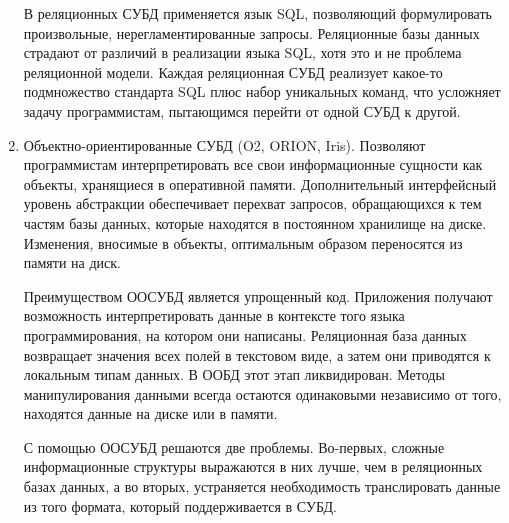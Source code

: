 \documentclass[12pt,a4paper,oneside]{article} %
\begin{document}
\begin{enumerate}
В реляционных СУБД применяется язык SQL, позволяющий \linebreak
формулировать произвольные, нерегламентированные запросы. \linebreak
Реляционные базы данных страдают от различий в реализации \linebreak
языка SQL, хотя это и не проблема реляционной модели. Каждая \linebreak
реляционная СУБД реализует какое-то подмножество стандарта \linebreak
SQL плюс набор уникальных команд, что усложняет задачу \linebreak
программистам, пытающимся перейти от одной СУБД к другой.
\item Объектно-ориентированные СУБД (O2, ORION, Iris). Позволяют \linebreak
программистам интерпретировать все свои информационные сущности \linebreak
как объекты, хранящиеся в оперативной памяти. Дополнительный \linebreak
интерфейсный уровень абстракции обеспечивает перехват запросов, \linebreak
обращающихся к тем частям базы данных, которые находятся в \linebreak
постоянном хранилище на диске. Изменения, вносимые в объекты, \linebreak
оптимальным образом переносятся из памяти на диск.

Преимуществом ООСУБД является упрощенный код. Приложения \linebreak
получают возможность интерпретировать данные в контексте того \linebreak
языка программирования, на котором они написаны. Реляционная \linebreak
база данных возвращает значения всех полей в текстовом виде, а \linebreak
затем они приводятся к локальным типам данных. В ООБД этот этап \linebreak
ликвидирован. Методы манипулирования данными всегда остаются \linebreak
одинаковыми независимо от того, находятся данные на диске или в памяти.

С помощью ООСУБД решаются две проблемы. Во-первых, сложные \linebreak
информационные структуры выражаются в них лучше, чем в реляционных \linebreak
базах данных, а во вторых, устраняется необходимость транслировать \linebreak
данные из того формата, который поддерживается в СУБД.


\end{enumerate}
\end{document}
